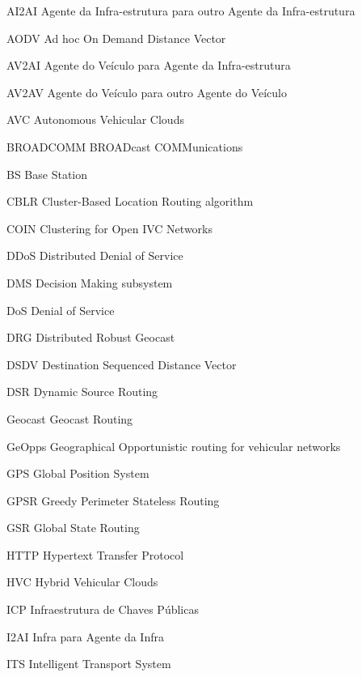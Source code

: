 \documentclass[
	12pt,				%
	oneside,			%
	a4paper,			%
	english,			%
	brazil				%
	]{abntex2ppgsi}
\begin{document}
%
%
\begin{siglas}

\item[AI2AI] Agente da Infra-estrutura para outro Agente da Infra-estrutura
\item[AODV] Ad hoc On Demand Distance Vector
\item[AV2AI] Agente do Veículo para Agente da Infra-estrutura
\item[AV2AV] Agente do Veículo para outro Agente do Veículo
\item[AVC] Autonomous Vehicular Clouds
\item[BROADCOMM] BROADcast COMMunications
\item[BS] Base Station
\item[CBLR] Cluster-Based Location Routing algorithm
\item[COIN] Clustering for Open  IVC Networks
\item[DDoS] Distributed Denial of Service
\item[DMS] Decision Making subsystem
\item[DoS] Denial of Service
\item[DRG] Distributed Robust Geocast
\item[DSDV] Destination Sequenced Distance Vector
\item[DSR] Dynamic Source Routing
\item[Geocast] Geocast Routing
\item[GeOpps]  Geographical Opportunistic routing for vehicular networks
\item[GPS] Global Position System
\item[GPSR]  Greedy Perimeter Stateless Routing
\item[GSR]  Global State Routing
\item[HTTP] Hypertext Transfer Protocol
\item[HVC] Hybrid Vehicular Clouds
\item[ICP] Infraestrutura de Chaves Públicas
\item[I2AI] Infra para Agente da Infra
\item[ITS] Intelligent Transport System

\end{siglas}
\end{document}
